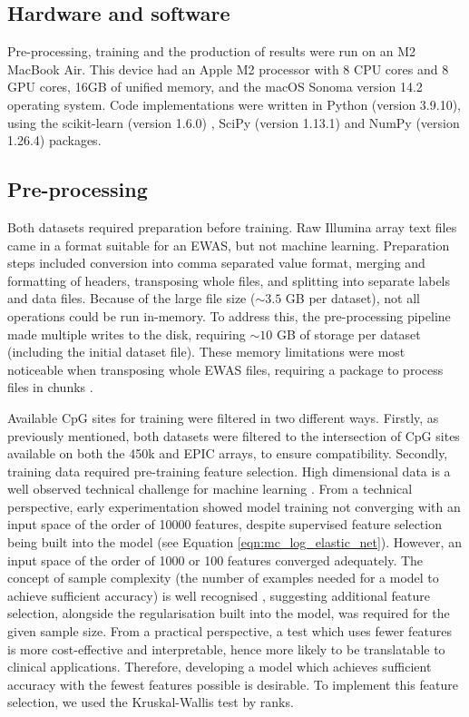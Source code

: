 \documentclass{article} %
\begin{document}
\subsection{Hardware and software}
Pre-processing, training and the production of results were run on an M2 MacBook Air. This device had an Apple M2 processor with 8 CPU cores and 8 GPU cores, 16GB of unified memory, and the macOS Sonoma version 14.2 operating system. Code implementations were written in Python (version 3.9.10), using the scikit-learn (version 1.6.0) \cite{scikit-learn}, SciPy (version 1.13.1) \cite{SciPy} and NumPy (version 1.26.4) \cite{harris2020array} packages.

\subsection{Pre-processing} \label{sec:pre-processing}
Both datasets required preparation before training. Raw Illumina array text files came in a format suitable for an EWAS, but not machine learning. Preparation steps included conversion into comma separated value format, merging and formatting of headers, transposing whole files, and splitting into separate labels and data files. Because of the large file size (\(\sim\!3.5\) GB per dataset), not all operations could be run in-memory. To address this, the pre-processing pipeline made multiple writes to the disk, requiring \(\sim\!10\) GB of storage per dataset (including the initial dataset file). These memory limitations were most noticeable when transposing whole EWAS files, requiring a package to process files in chunks \cite{transposecsv}.

Available CpG sites for training were filtered in two different ways. Firstly, as previously mentioned, both datasets were filtered to the intersection of CpG sites available on both the 450k and EPIC arrays, to ensure compatibility. Secondly, training data required pre-training feature selection. High dimensional data is a well observed technical challenge for machine learning \cite{cai2018feature}. From a technical perspective, early experimentation showed model training not converging with an input space of the order of \num{10000} features, despite supervised feature selection being built into the model (see Equation \ref{eqn:mc_log_elastic_net}). However, an input space of the order of \num{1000} or \num{100} features converged adequately. The concept of sample complexity (the number of examples needed for a model to achieve sufficient accuracy) is well recognised \cite{blum1997selection}, suggesting additional feature selection, alongside the regularisation built into the model, was required for the given sample size. From a practical perspective, a test which uses fewer features is more cost-effective and interpretable, hence more likely to be translatable to clinical applications. Therefore, developing a model which achieves sufficient accuracy with the fewest features possible is desirable. To implement this feature selection, we used the Kruskal-Wallis test by ranks.
\end{document}
